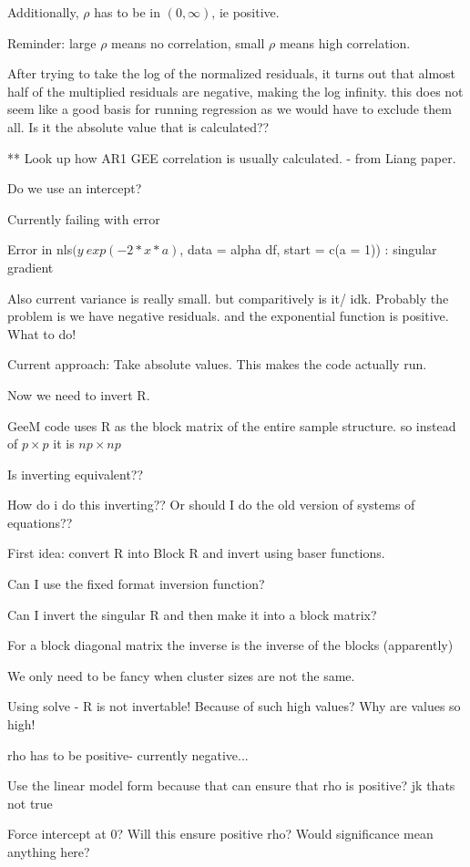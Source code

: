 \documentclass[10pt]{article}
\begin{document}
Additionally, $\rho$ has to be in $(0,\infty)$, ie positive.

Reminder: large $\rho$ means no correlation, small $\rho$ means high correlation.

After trying to take the log of the normalized residuals, it turns out that almost half of the multiplied residuals are negative, making the log infinity. this does not seem like a good basis for running regression as we would have to exclude them all. Is it the absolute value that is calculated??

** Look up how AR1 GEE correlation is usually calculated. - from Liang paper.

Do we use an intercept?

Currently failing with error

Error in nls$(y ~ exp(-2 * x * a)$, data = alpha df, start = c(a = 1)) :
  singular gradient

Also current variance is really small. but comparitively is it/ idk.
Probably the problem is we have negative residuals. and the exponential function is positive. What to do!

Current approach: Take absolute values. This makes the code actually run.

Now we need to invert R.

GeeM code uses R as the block matrix of the entire sample structure. so instead of $p \times p$ it is $np \times np$

Is inverting equivalent??

How do i do this inverting??
Or should I do the old version of systems of equations??

First idea: convert R into Block R and invert using baser functions.

Can I use the fixed format inversion function?

Can I invert the singular R and then make it into a block matrix?

For a block diagonal matrix the inverse is the inverse of the blocks (apparently)

We only need to be fancy when cluster sizes are not the same.


Using solve - R is not invertable! Because of such high values?
Why are values so high!

rho has to be positive- currently negative...

Use the linear model form because that can ensure that rho is positive? jk thats not true

Force intercept at 0? Will this ensure positive rho?
Would significance mean anything here?
\end{document}
